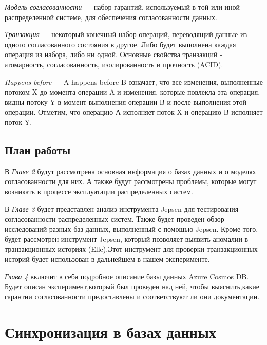 \documentclass[12pt,  openany]{book}
\begin{document}
\emph{Модель согласованности} --- набор гарантий, используемый в той или иной распределенной системе,  для обеспечения согласованности данных.

\emph{Транзакция} ---  некоторый конечный набор операций, переводящий данные из одного согласованного состояния в другое. Либо будет выполнена каждая операция из набора, либо ни одной. Основные свойства транзакций - атомарность, согласованность, изолированность и прочность (ACID).

\emph{Happens before} --- A happens-before B означает, что все изменения, выполненные потоком X до момента операции A и изменения, которые повлекла эта операция, видны потоку Y в момент выполнения операции B и после выполнения этой операции. Отметим, что операцию А исполняет поток X  и операцию B  исполняет поток Y. \cite{habrMemoryModel}

\section{План работы}
В \textit{Главе 2} будут рассмотрена основная информация о базах данных и о моделях согласованности для них. А также будут рассмотрены проблемы, которые могут возникать в процессе эксплуатации распределенных систем.
\par
В \textit{Главе 3} будет представлен анализ инструмента Jepsen для тестирования согласованности распределенных систем. Также будет проведен обзор исследований разных баз данных, выполненный с помощью Jepsen. Кроме того, будет рассмотрен инструмент Jepsen, который позволяет выявить аномалии в транзакционных историях (Elle).Этот инструмент для проверки транзакционных историй будет использован в дальнейшем в нашем эксперименте.
 \par
\textit{Глава 4} включит в себя подробное описание базы данных Azure Cosmos DB. Будет описан эксперимент,который был проведен над ней, чтобы выяснить,какие гарантии согласованности предоставлены и соответствуют ли они документации.

\chapter{Синхронизация в базах данных}
\end{document}
